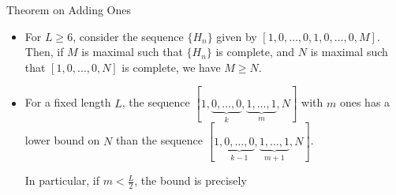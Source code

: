 \documentclass{beamer}
\begin{document}
\begin{frame}{Theorem on Adding Ones}
    \begin{theorem}[SMALL 2020]
\begin{itemize}
\item
For $L \geq 6$, consider the sequence $\{ H_n\}$ given by $[1,0,\dots,0,1,0,\ldots,0,M]$. Then, if  $M$ is maximal such that $\{H_n\}$ is complete, and $N$ is maximal such that 
$[1,0,\dots,0,N]$ is complete, we have $M\geq N$.
\item
For a fixed length $L$, the sequence $[1,\underbrace{0,\ldots, 0}_{k},\underbrace{1,\ldots,1}_{m},N]$ with $m$ ones has a lower bound on $N$ than the sequence $[1,\underbrace{0,\ldots, 0}_{k-1},\underbrace{1,\ldots,1}_{m+1},N]$.

In particular, if $m<\frac{L}{2}$, the bound is precisely
\begin{center}\end{center}

\end{itemize}
\end{theorem}
\end{frame}
\end{document}
